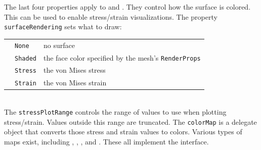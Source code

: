 The last four properties apply to 
 and 
.
They control how the surface is colored.  This can be used to enable stress/strain
visualizations.  The property {\tt surfaceRendering} sets what to draw:\\
\medskip
\begin{tabular}{lll}
& {\tt None} & no surface\\
& {\tt Shaded} & the face color specified by the mesh's {\tt RenderProps}\\
& {\tt Stress} & the von Mises stress\\
& {\tt Strain} & the von Mises strain
\end{tabular}
\medskip\\
The {\tt stressPlotRange} controls the range of values to use when plotting 
stress/strain.  Values outside this range are truncated.  The {\tt colorMap}
is a delegate object that converts those stress and strain values to colors.
Various types of maps exist, including 
,
,
, and
.  These all implement the
 interface.

